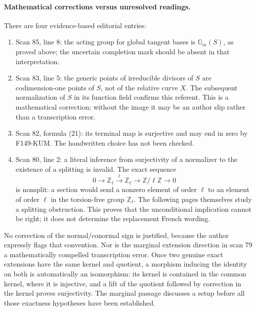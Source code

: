 \documentclass[11pt,a4paper]{article}
\theoremstyle{definition}
\begin{document}
\paragraph{Mathematical corrections versus unresolved readings.}
There are four evidence-based editorial entries:
\begin{enumerate}
 \item Scan 85, line 8: the acting group for global tangent bases is
 \(\mathbb G_m(S)\), as proved above; the uncertain completion mark
 should be absent in that interpretation.
 \item Scan 83, line 5: the generic points of irreducible divisors of
 \(S\) are codimension-one points of \(S\), not of the relative curve
 \(X\).  The subsequent normalization of \(S\) in its function field
 confirms this referent.  This is a mathematical correction; without
 the image it may be an author slip rather than a transcription error.
 \item Scan 82, formula (21): its terminal map is surjective and may
 end in zero by F149-KUM.  The handwritten choice has not been checked.
 \item Scan 80, line 2: a literal inference from surjectivity of a
 normalizer to the existence of a splitting is invalid.  The exact
 sequence
 \[
 0\longrightarrow\mathbb Z_\ell
 \xrightarrow{\;\ell\;}\mathbb Z_\ell
 \longrightarrow\mathbb Z/\ell\mathbb Z\longrightarrow0
 \]
 is nonsplit: a section would send a nonzero element of order \(\ell\)
 to an element of order \(\ell\) in the torsion-free group
 \(\mathbb Z_\ell\).  The following pages themselves study a splitting
 obstruction.  This proves that the unconditional implication cannot
 be right; it does not determine the replacement French wording.
\end{enumerate}

No correction of the normal/conormal sign is justified, because the
author expressly flags that convention.  Nor is the marginal extension
direction in scan 79 a mathematically compelled transcription error.
Once two genuine exact extensions have the same kernel and quotient,
a morphism inducing the identity on both is automatically an
isomorphism: its kernel is contained in the common kernel, where it
is injective, and a lift of the quotient followed by correction in the
kernel proves surjectivity.  The marginal passage discusses a setup
before all those exactness hypotheses have been established.
\end{document}

